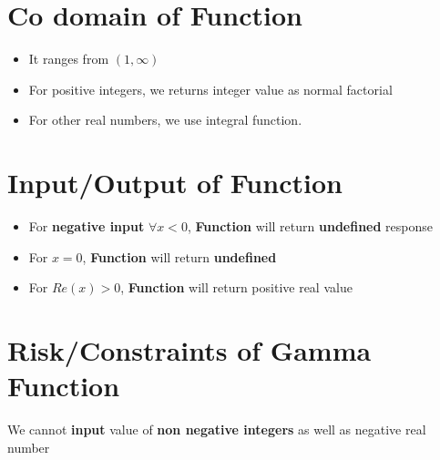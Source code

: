 \documentclass{article}
\begin{document}
\section{Co domain of Function}
\begin{itemize}
\item It ranges from $(1, \infty)$
\item For positive integers, we returns integer value as normal factorial
\item For other real numbers, we use integral function.
\end{itemize}

\section{Input/Output of Function}
\begin{itemize}
\item For \textbf{negative input} $\forall x<0 $, \textbf{Function} will return \textbf{undefined} response
\item For \textbf{$x=0$}, \textbf{Function} will return \textbf{undefined}
\item For \textbf{$Re(x) > 0$}, \textbf{Function} will return positive real value
\end{itemize}

\section{Risk/Constraints of Gamma Function}
We cannot \textbf{input} value of \textbf{non negative integers} as well as negative real number
\end{document}
